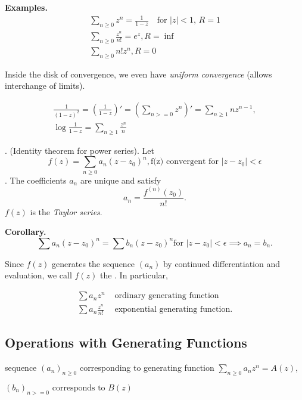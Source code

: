\textbf{Examples.}
\begin{gather*}
    \sum_{n≥0} z^n =
        \frac1{1-z}\quad\text{for $|z|<1$, } R = 1 \\
    \sum_{n≥0} \frac{z^n}{n!} =
        e^z, R = \inf \\
    \sum_{n≥0} n! z^n, R = 0
\end{gather*}

Inside the disk of convergence, we even have \emph{uniform convergence} (allows interchange of limits).

\begin{gather*}
    \frac1{(1-z)^2}
    = \left(\frac1{1-z}\right)'
    = \left(\sum_{n>=0} z^n\right)'
    = \sum_{n≥1} n z^{n-1}, \\
    \log\frac{1}{1-z} = \sum_{n≥1} \frac{z^n}{n}
\end{gather*}

\Theorem. (Identity theorem for power series).
Let
\[
    f(z) = \sum_{n≥0} a_n (z-z_0)^n,
    \text{f(z) convergent for $|z-z_0| < \epsilon$}
\].
The coefficients $a_n$ are unique and satisfy
\[
    a_n = \frac{f^{(n)}(z_0)}{n!}.
\]
$f(z)$ is the \emph{Taylor series}.

\textbf{Corollary.}
\[
    \sum a_n (z-z_0)^n =
    \sum b_n (z-z_0)^n
    \text{for $|z-z_0| < \epsilon$}
    \implies
    a_n = b_n.
\]

Since $f(z)$ generates the sequence $(a_n)$ by continued differentiation and evaluation, we call $f(z)$ the . In particular,

\begin{align*}
\sum a_n z^n & \text{ ordinary generating function} \\
\sum a_n \frac{z^n}{n!} & \text{ exponential generating function.}
\end{align*}


\subsection{Operations with Generating Functions}

sequence $(a_n)_{n≥0}$ corresponding to generating function
$\sum_{n≥0} a_n z^n = A(z)$,

$(b_n)_{n>=0} \text{ corresponds to } B(z)$


